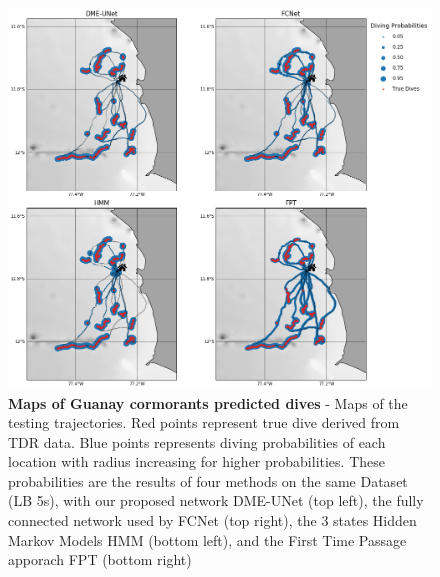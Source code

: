 \documentclass{article}
\begin{document}
\begin{figure}[h]
  \centering
  \includegraphics[scale=0.5]{figure4b.png}
  \caption{\textbf{Maps of Guanay cormorants predicted dives} - Maps of the testing trajectories. Red points represent true dive derived from TDR data. Blue points represents diving probabilities of each location with radius increasing for higher probabilities. These probabilities are the results of four methods on the same Dataset (LB 5s), with our proposed network DME-UNet (top left), the fully connected network used by \cite{browning_predicting_2018}  FCNet (top right), the 3 states Hidden Markov Models HMM (bottom left), and the First Time Passage apporach FPT (bottom right)}
  \label{figure4b}
\end{figure}
\end{document}

